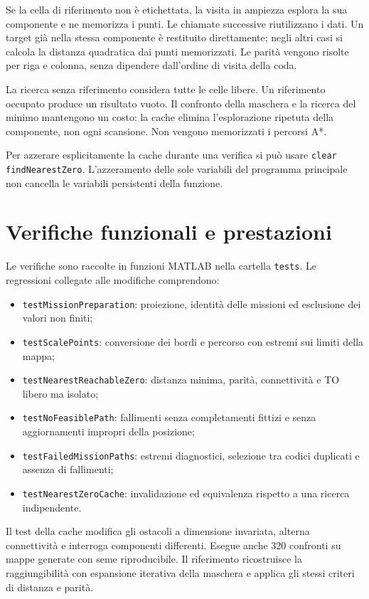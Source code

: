 Se la cella di riferimento non è etichettata, la visita in ampiezza esplora
la sua componente e ne memorizza i punti. Le chiamate successive riutilizzano
i dati. Un target già nella stessa componente è restituito direttamente;
negli altri casi si calcola la distanza quadratica dai punti memorizzati.
Le parità vengono risolte per riga e colonna, senza dipendere dall'ordine
di visita della coda.

La ricerca senza riferimento considera tutte le celle libere. Un riferimento
occupato produce un risultato vuoto. Il confronto della maschera e la
ricerca del minimo mantengono un costo: la cache elimina l'esplorazione
ripetuta della componente, non ogni scansione. Non vengono memorizzati i
percorsi A*.

Per azzerare esplicitamente la cache durante una verifica si può usare
\texttt{clear findNearestZero}. L'azzeramento delle sole variabili del
programma principale non cancella le variabili persistenti della funzione.

\section{Verifiche funzionali e prestazioni}
\label{sec:impl-verifiche}

Le verifiche sono raccolte in funzioni MATLAB nella cartella \texttt{tests}.
Le regressioni collegate alle modifiche comprendono:
\begin{itemize}
    \item \texttt{testMissionPreparation}: proiezione, identità delle
          missioni ed esclusione dei valori non finiti;
    \item \texttt{testScalePoints}: conversione dei bordi e percorso con
          estremi sui limiti della mappa;
    \item \texttt{testNearestReachableZero}: distanza minima, parità,
          connettività e TO libero ma isolato;
    \item \texttt{testNoFeasiblePath}: fallimenti senza completamenti
          fittizi e senza aggiornamenti impropri della posizione;
    \item \texttt{testFailedMissionPaths}: estremi diagnostici, selezione
          tra codici duplicati e assenza di fallimenti;
    \item \texttt{testNearestZeroCache}: invalidazione ed equivalenza
          rispetto a una ricerca indipendente.
\end{itemize}

Il test della cache modifica gli ostacoli a dimensione invariata, alterna
connettività e interroga componenti differenti. Esegue anche 320 confronti
su mappe generate con seme riproducibile. Il riferimento ricostruisce la
raggiungibilità con espansione iterativa della maschera e applica gli stessi
criteri di distanza e parità.

